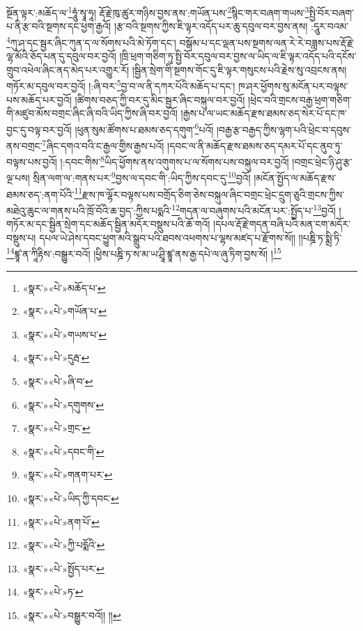 སྔོན་ལྟར་:མཆོད་ལ་\footnote{«སྣར་»«པེ་»མཆོད་པ་}ཧཱུཾ་སྭཱ་ཧཱ། རྡོ་རྗེ་ཁུ་ཚུར་གཉིས་བྱས་ནས་:གཡོན་པས་\footnote{«སྣར་»«པེ་»གཡོན་པ་}སྙིང་གར་བཞག་གཡས་\footnote{«སྣར་»«པེ་»གཡས་པ་}སྤྱི་བོར་བཞག་པ་ནི་རྩ་བའི་སྔགས་དང་ཕྱག་རྒྱའོ། །རྩ་བའི་སྔགས་ཀྱིས་ཇི་ལྟར་འདོད་པར་ཆུ་དབུལ་བར་བྱས་ནས། :དཱུར་བའམ་\footnote{«སྣར་»«པེ་»དུརྦ་}ཀུ་ཤ་དང་སྦྱར་ཞིང་ཀུན་ད་ལ་སོགས་པའི་མེ་ཏོག་དང་། བསྒོམ་པ་དང་ལྡན་པས་སྔགས་ལན་རེ་རེ་བཟླས་པས་རྡོ་རྗེ་ལྷ་མོའི་ཅོད་པན་དུ་དབུལ་བར་བྱའོ། །ཁྲི་ཕྲག་གཅིག་ཏུ་སྤྱི་བོར་དབུལ་བར་བྱས་ལ་ཡིད་ལ་ཇི་ལྟར་འདོད་པའི་དངོས་གྲུབ་འཕེལ་ཞིང་ནད་མེད་པར་འགྱུར་རོ། །སྦྱིན་སྲེག་གི་སྔགས་གོང་དུ་ཇི་ལྟར་གསུངས་པའི་རྗེས་སུ་འབྲངས་ནས། གཏོར་མ་དབུལ་བར་བྱའོ། །:ཞི་བར་\footnote{«སྣར་»«པེ་»ཞི་བ་}བྱ་བ་ལ་ནི་དཀར་པོའི་མཆོད་པ་དང་། ཁ་ཤར་ཕྱོགས་སུ་མངོན་པར་བལྟས་པས་མཆོད་པར་བྱའོ། །ཚིགས་བཅད་ཀྱི་བར་དུ་མིང་སྦྱར་ཞིང་བསྐུལ་བར་བྱའོ། །ཕྲེང་བའི་གྲངས་བརྒྱ་ཕྲག་གཅིག་གི་མཛུབ་མོས་བགྲང་ཞིང་ཞི་བའི་ཡིད་ཀྱིས་ཞི་བར་བྱའོ། །རྒྱས་པ་ལ་ཡང་མཆོད་རྫས་ཐམས་ཅད་སེར་པོ་དང་ཁ་བྱང་དུ་བལྟ་བར་བྱའོ། །ཕུན་སུམ་ཚོགས་པ་ཐམས་ཅད་དགུག་\footnote{«སྣར་»«པེ་»དགུགས་}པའོ། །བརྒྱ་རྩ་བརྒྱད་ཀྱིས་ལྷག་པའི་ཕྲེང་བ་དབུས་ནས་བགྲང་\footnote{«སྣར་»«པེ་»གྲང་}ཞིང་དགའ་བའི་ང་རྒྱལ་གྱིས་རྒྱས་པའོ། །དབང་ལ་ནི་མཆོད་རྫས་ཐམས་ཅད་དམར་པོ་དང་ནུབ་ཏུ་བལྟས་པས་བྱའོ། །:དབང་གིས་\footnote{«སྣར་»«པེ་»དབང་གི་}ཡིད་ཕྱོགས་ནས་འགུགས་པ་ལ་སོགས་པས་བསྐུལ་བར་བྱའོ། །བགྲང་ཕྲེང་ཉི་ཤུ་རྩ་ལྔ་པས། སྲིན་ལག་ལ་:གནས་པར་\footnote{«སྣར་»«པེ་»གནག་པར་}བྱས་ལ་དབང་གི་:ཡིད་ཀྱིས་དབང་དུ་\footnote{«སྣར་»«པེ་»ཡིད་ཀྱི་དབང་}བྱའོ། །མངོན་སྤྱོད་ལ་མཆོད་རྫས་ཐམས་ཅད་:ནག་པོའི་\footnote{«སྣར་»«པེ་»ནག་པོ་}རྫས་ཁ་ལྷོར་བལྟས་པས་བགྲོད་ཅིག་ཅེས་བསྐུལ་ཞིང་བགྲང་ཕྲེང་དྲུག་ཅུའི་གྲངས་ཀྱིས་མཐེའུ་ཆུང་ལ་གནས་པའི་ཁྲོ་བོའི་ཆ་བྱད་:ཀྱིས་པདྨའི་\footnote{«སྣར་»«པེ་»ཀྱི་པདྨོའི་}གདན་ལ་བཞུགས་པའི་མངོན་པར་:སྤྱོད་པ་\footnote{«སྣར་»«པེ་»སྤྱོད་པར་}བྱའོ། །གཏོར་མ་དང་སྦྱིན་སྲེག་དང་མཆོད་སྦྱིན་མདོར་བསྡུས་པའི་ཆོ་གའོ། །དཔལ་རྡོ་རྗེ་གདན་བཞི་པའི་མན་ངག་མདོར་བསྡུས་པ། དཔལ་ཡེ་ཤེས་དབང་ཕྱུག་མའི་སྒྲུབ་པའི་ཐབས་འཕགས་པ་ལྷས་མཛད་པ་རྫོགས་སོ།། །།པཎྜི་ཏ་སྨྲི་ཏི་\footnote{«སྣར་»«པེ་»ཏ་}ཛྙཱ་ན་ཀཱིརྟིས་:བསྒྱུར་བའོ། །ཕྱིས་པཎྜི་ཏ་ས་མ་ཡ་ཤྲཱི་ཛྙཱ་ནས་རྒྱ་དཔེ་ལ་ཞུ་ཏིག་བྱས་སོ། །\footnote{«སྣར་»«པེ་»བསྒྱུར་བའོ།། །།}